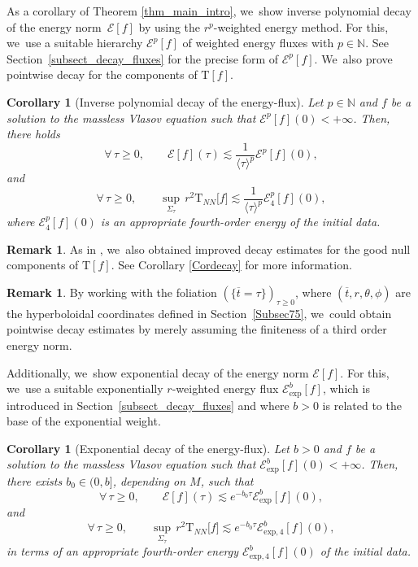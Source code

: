 \documentclass[10pt]{amsart}
\theoremstyle{plain}
\newtheorem{corollary}[proposition]{Corollary}
\theoremstyle{definition}
\newtheorem{remark}[proposition]{Remark}
\begin{document}
As a corollary of Theorem \ref{thm_main_intro}, we~show inverse polynomial decay of the energy norm~$\mathcal{E}[f]$ by using the $r^p$-weighted energy method. For this, we~use a suitable hierarchy $\mathcal{E}^p[f]$ of weighted energy fluxes with $p\in \mathbb{N}$. See Section~\ref{subsect_decay_fluxes} for the precise form of $\mathcal{E}^p[f]$. We~also prove pointwise decay for the components of $\mathrm{T}[f]$.

\begin{corollary}[Inverse polynomial decay of the energy-flux]\label{Corintro}
Let $p\in \mathbb{N}$ and $f $ be a solution to the massless Vlasov equation such that $\mathcal{E}^p[f](0) < +\infty$. Then, there holds
\begin{equation}
\forall \, \tau \geq 0, \qquad \mathcal{E}[f](\tau) \lesssim \frac{1}{\langle \tau \rangle^{p}} \mathcal{E}^{p}[f](0),
\end{equation}
and
\begin{equation}
\forall \, \tau \geq 0, \qquad \sup _{\Sigma_\tau} \, r^2 \mathrm{T}_{NN}\bigl[f\bigr] \lesssim \frac{1}{\langle \tau \rangle^{p}} \mathcal{E}^{p}_{4} [f](0),
\end{equation}
where $\mathcal{E}^{p}_{4} [f](0)$ is an appropriate fourth-order energy of the initial data.
\end{corollary}
\begin{remark}
As in \cite{L23,VR23, W23}, we~also obtained improved decay estimates for the good null components of $\mathrm{T}[f]$. See Corollary \ref{Cordecay} for more information.
\end{remark}
\begin{remark}
By working with the foliation $(\{\overline{t}=\tau\})_{\tau \geq 0}$, where $(\overline{t},r,\theta, \phi)$ are the hyperboloidal coordinates defined in Section~\ref{Subsec75}, we~could obtain pointwise decay estimates by merely assuming the finiteness of a third order energy norm.
\end{remark}

Additionally, we~show exponential decay of the energy norm $\mathcal{E}[f]$. For this, we~use a suitable exponentially $r$-weighted energy flux $\mathcal{E}^b_{\mathrm{exp}}[f]$, which is introduced in Section~\ref{subsect_decay_fluxes} and where $b>0$ is related to the base of the exponential weight.

\begin{corollary}[Exponential decay of the energy-flux]\label{Corintro2}
Let $b>0$ and $f $ be a solution to the massless Vlasov equation such that $\mathcal{E}^b_{\mathrm{exp}}[f](0) <+\infty$. Then, there exists $b_0 \in(0,b]$, depending on $M$, such that
\[
\forall \, \tau \geq 0, \qquad \mathcal{E}[f](\tau) \lesssim e^{-b_0 \tau} \mathcal{E}_{\mathrm{exp}}^b[f](0),
\]
and
\begin{equation}
\forall \, \tau \geq 0, \qquad \sup _{\Sigma_\tau} \, r^2 \mathrm{T}_{NN}\bigl[f\bigr] \lesssim e^{-b_0 \tau}\mathcal{E}^{b}_{\mathrm{exp},4} [f](0),
\end{equation}
in terms of an appropriate fourth-order energy $\mathcal{E}^{b}_{\mathrm{exp},4} [f](0)$ of the initial data.
\end{corollary}
\end{document}
